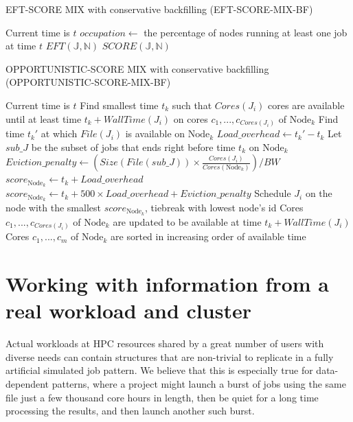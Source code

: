 \documentclass[conference,10pt]{IEEEtran}
\newcommand{\Node}[1]{\ensuremath{\mathrm{Node}_{#1}}\xspace}
\newcommand{\file}{\ensuremath{\mathit{File}}\xspace}
\newcommand{\size}{\ensuremath{\mathit{Size}}\xspace}
\newcommand{\bandwidth}{\mathit{BW}\xspace}
\newcommand{\core}{\mathit{Cores}\xspace}
\newcommand{\walltime}{\mathit{WallTime}\xspace}
\newcommand{\jobset}{\ensuremath{\mathbb{J}}\xspace}
\newcommand{\nodeset}{\ensuremath{\mathbb{N}}\xspace}
\begin{document}
\begin{algorithm}[htbp]
\caption{EFT-SCORE MIX with conservative backfilling (EFT-SCORE-MIX-BF)}
\begin{algorithmic}[1]
	\Statex Current time is $t$
		\State $occupation \gets$ the percentage of nodes running at least one job at time $t$
			\State $EFT(\jobset,\nodeset)$
		\Else
			\State $SCORE(\jobset,\nodeset)$
		\EndIf
	\EndFor
\end{algorithmic}
\end{algorithm}

\begin{algorithm}[htbp]
\caption{OPPORTUNISTIC-SCORE MIX with conservative backfilling (OPPORTUNISTIC-SCORE-MIX-BF)}
\begin{algorithmic}[1]
	\Statex Current time is $t$
		\ForEach{$\Node{k} \in \nodeset$}
			\State Find smallest time $t_k$ such that $\core(J_i)$ cores are available until at least time $t_k + \walltime(J_i)$ on cores $c_1, ..., c_{\core(J_i)}$ of $\Node{k}$
			\State Find time $t_k'$ at which $\file(J_i)$ is available on $\Node{k}$
			\State $Load\_overhead \gets t_k' - t_k$ 
			\State Let $\mathit{sub\_J}$ be the subset of jobs that ends right before time $t_k$ on $\Node{k}$
			\State $Eviction\_penalty \gets (\size(\file(\mathit{sub\_J})) \times \frac{\core(J_i)}{\core(\Node{k})})/\bandwidth$
				\State $score_{\Node{k}} \gets t_k + Load\_overhead$
			\Else
				\State $score_{\Node{k}} \gets t_k + 500 \times Load\_overhead + Eviction\_penalty$
			\EndIf
		\EndFor
		\State Schedule $J_i$ on the node with the smallest $score_{\Node{k}}$, tiebreak with lowest node's id
		\State Cores $c_1, ..., c_{\core(J_i)}$ of $\Node{k}$ are updated to be available at time $t_k + \walltime(J_i)$
		\State Cores $c_1, ..., c_m$ of $\Node{k}$ are sorted in increasing order of available time
	\EndFor
\end{algorithmic}
\end{algorithm}

\section{Working with information from a real workload and cluster}\label{sec.working}
Actual workloads at HPC resources shared by a great number of users with diverse needs can contain structures
that are non-trivial to replicate in a fully artificial simulated job pattern. We believe that this is especially
true for data-dependent patterns, where a project might launch a burst of jobs using the same file just a few thousand
core hours in length, then be quiet for a long time processing the results, and then launch another such burst.
\end{document}
